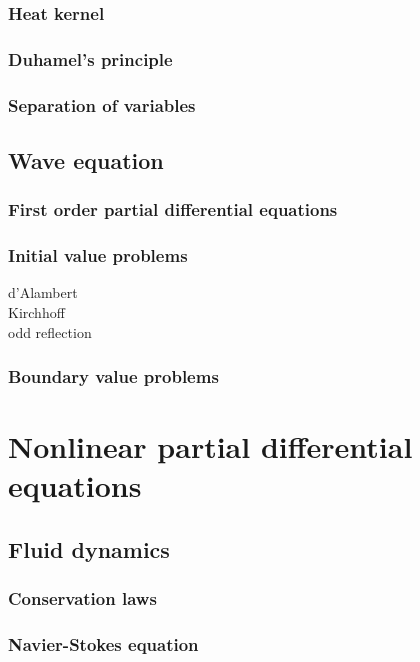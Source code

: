\documentclass{../note}
\begin{document}
\section{Heat kernel}
\section{Duhamel's principle}
\section{Separation of variables}






\chapter{Wave equation}
\section{First order partial differential equations}
\section{Initial value problems}
d'Alambert\\
Kirchhoff\\
odd reflection

\section{Boundary value problems}







\part{Nonlinear partial differential equations}

\chapter{Fluid dynamics}
\section{Conservation laws}
\section{Navier-Stokes equation}
\end{document}
